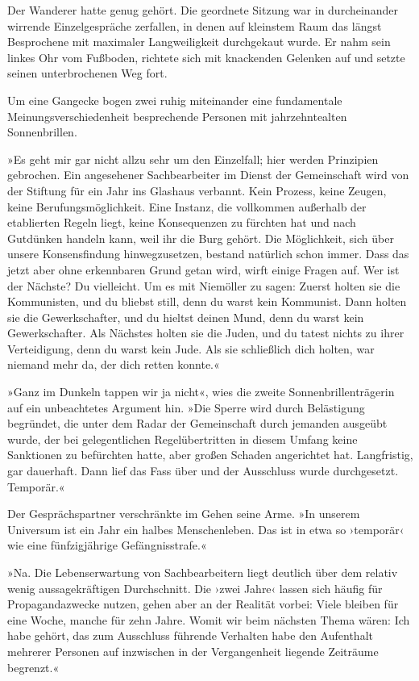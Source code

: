 Der Wanderer hatte genug gehört. Die geordnete Sitzung war in durcheinander wirrende Einzelgespräche zerfallen, in denen auf kleinstem Raum das längst Besprochene mit maximaler Langweiligkeit durchgekaut wurde. Er nahm sein linkes Ohr vom Fußboden, richtete sich mit knackenden Gelenken auf und setzte seinen unterbrochenen Weg fort.

Um eine Gangecke bogen zwei ruhig miteinander eine fundamentale Meinungsverschiedenheit besprechende Personen mit jahrzehntealten Sonnenbrillen.

»Es geht mir gar nicht allzu sehr um den Einzelfall; hier werden Prinzipien gebrochen. Ein angesehener Sachbearbeiter im Dienst der Gemeinschaft wird von der Stiftung für ein Jahr ins Glashaus verbannt. Kein Prozess, keine Zeugen, keine Berufungsmöglichkeit. Eine Instanz, die vollkommen außerhalb der etablierten Regeln liegt, keine Konsequenzen zu fürchten hat und nach Gutdünken handeln kann, weil ihr die Burg gehört. Die Möglichkeit, sich über unsere Konsensfindung hinwegzusetzen, bestand natürlich schon immer. Dass das jetzt aber ohne erkennbaren Grund getan wird, wirft einige Fragen auf. Wer ist der Nächste? Du vielleicht. Um es mit Niemöller zu sagen: Zuerst holten sie die Kommunisten, und du bliebst still, denn du warst kein Kommunist. Dann holten sie die Gewerkschafter, und du hieltst deinen Mund, denn du warst kein Gewerkschafter. Als Nächstes holten sie die Juden, und du tatest nichts zu ihrer Verteidigung, denn du warst kein Jude. Als sie schließlich dich holten, war niemand mehr da, der dich retten konnte.«

»Ganz im Dunkeln tappen wir ja nicht«, wies die zweite Sonnenbrillenträgerin auf ein unbeachtetes Argument hin. »Die Sperre wird durch Belästigung begründet, die unter dem Radar der Gemeinschaft durch jemanden ausgeübt wurde, der bei gelegentlichen Regelübertritten in diesem Umfang keine Sanktionen zu befürchten hatte, aber großen Schaden angerichtet hat. Langfristig, gar dauerhaft. Dann lief das Fass über und der Ausschluss wurde durchgesetzt. Temporär.«

Der Gesprächspartner verschränkte im Gehen seine Arme. »In unserem Universum ist ein Jahr ein halbes Menschenleben. Das ist in etwa so ›temporär‹ wie eine fünfzigjährige Gefängnisstrafe.«

»Na. Die Lebenserwartung von Sachbearbeitern liegt deutlich über dem relativ wenig aussagekräftigen Durchschnitt. Die ›zwei Jahre‹ lassen sich häufig für Propagandazwecke nutzen, gehen aber an der Realität vorbei: Viele bleiben für eine Woche, manche für zehn Jahre. Womit wir beim nächsten Thema wären: Ich habe gehört, das zum Ausschluss führende Verhalten habe den Aufenthalt mehrerer Personen auf inzwischen in der Vergangenheit liegende Zeiträume begrenzt.«

